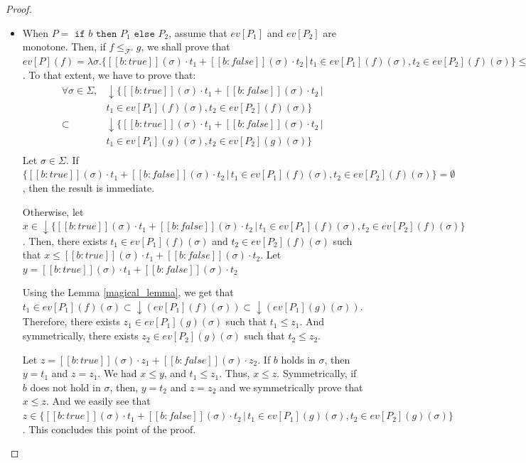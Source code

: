 \documentclass[a4paper,10pt]{llncs}
\begin{document}
\begin{proof}
\begin{itemize}
\item When $P = \texttt{ if } b \texttt{ then } P_1 \texttt{ else } P_2$, assume that $ev[P_1]$ and $ev[P_2]$ are monotone. Then, if $f \leq_{\mathcal{F}'} g$, we shall prove that $ev[P](f) = \lambda\sigma.\{[\![b : true ]\!](\sigma)\cdot t_1 + [\![b : false ]\!](\sigma)\cdot t_2 \,|\,t_1 \in ev[P_1](f)(\sigma), t_2 \in ev[P_2](f)(\sigma) \} \leq_{\mathcal{F}'} \lambda\sigma.\{[\![b : true ]\!](\sigma)\cdot t_1 + [\![b : false ]\!](\sigma)\cdot t_2 \,|\, t_1 \in ev[P_1](g)(\sigma), t_2 \in ev[P_2](g)(\sigma) \} = ev[P](g)$. \newline
To that extent, we have to prove that:
\begin{align*}
\forall \sigma \in \Sigma, & \downarrow \{[\![b : true ]\!](\sigma)\cdot t_1 + [\![b : false ]\!](\sigma) \cdot t_2 \,|\, \\
& t_1 \in ev[P_1](f)(\sigma), t_2 \in ev[P_2](f)(\sigma) \} \\
\subset & \downarrow  \{ [\![b : true ]\!](\sigma) \cdot t_1 + [\![b : false ]\!](\sigma) \cdot t_2 \,|\, \\
& t_1 \in ev[P_1](g)(\sigma), t_2 \in ev[P_2](g)(\sigma) \} \\
\end{align*}
Let $\sigma \in \Sigma$. If $\{[\![b : true ]\!](\sigma)\cdot t_1 + [\![b : false ]\!](\sigma)\cdot t_2 \,|\, t_1 \in ev[P_1](f)(\sigma), t_2 \in ev[P_2](f)(\sigma) \} = \emptyset$, then the result is immediate.\bigskip

Otherwise, let $x \in \downarrow \{[\![b : true ]\!](\sigma)\cdot t_1 + [\![b : false ]\!](\sigma)\cdot t_2 \,|\, t_1 \in ev[P_1](f)(\sigma), t_2 \in ev[P_2](f)(\sigma) \} $.\newline
Then, there exists $t_1 \in ev[P_1](f)(\sigma)$ and $t_2 \in ev[P_2](f)(\sigma)$ such that $x \leq  [\![b : true ]\!](\sigma)\cdot t_1 + [\![b : false ]\!](\sigma)\cdot t_2 $. Let $y = [\![b : true ]\!](\sigma)\cdot t_1 + [\![b : false ]\!](\sigma)\cdot t_2
$\bigskip

Using the Lemma \ref{magical_lemma}, we get that $t_1 \in ev[P_1](f)(\sigma) \subset \downarrow(ev[P_1](f)(\sigma)) \subset \downarrow(ev[P_1](g)(\sigma))$. Therefore, there exists $z_1 \in ev[P_1](g)(\sigma)$ such that $t_1 \leq z_1$. And symmetrically, there exists $z_2 \in ev[P_2](g)(\sigma)$ such that $t_2 \leq z_2$.\newline

Let $z = [\![b : true ]\!](\sigma) \cdot z_1 + [\![b : false ]\!](\sigma) \cdot z_2$.\newline
If $b$ holds in $\sigma$, then $y = t_1$ and $z = z_1$. We had $x \leq y$, and $t_1 \leq z_1$. Thus, $x \leq z$. Symmetrically, if $b$ does not hold in $\sigma$, then, $y = t_2$ and $z = z_2$ and we symmetrically prove that $x \leq z$. And we easily see that $z \in \{ [\![b : true ]\!](\sigma) \cdot t_1 + [\![b : false ]\!](\sigma) \cdot t_2 \,|\,
t_1 \in ev[P_1](g)(\sigma), t_2 \in ev[P_2](g)(\sigma) \}$. This concludes this point of the proof.\bigskip


\end{itemize}
\end{proof}
\end{document}
